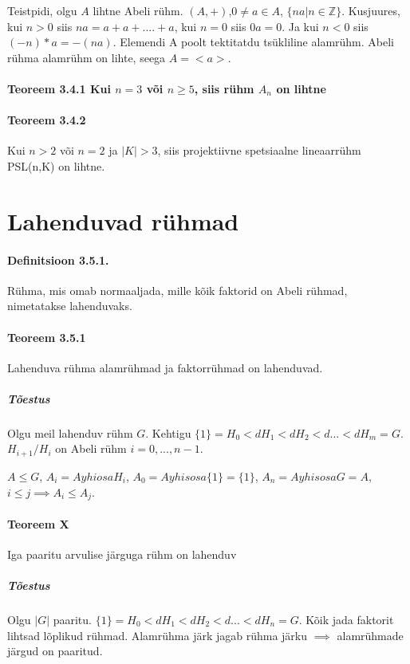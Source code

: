 \documentclass[12pt]{report}
\numberwithin{equation}{section}
\theoremstyle{definition}
\theoremstyle{plain}
\begin{document}
Teistpidi, olgu $A$ lihtne Abeli rühm. $(A,+)$,$0 \neq a \in A$, $ \{na | n \in \mathbb{Z}\}$. Kusjuures, kui $n >0 $ siis $na = a + a + .... + a$, kui $n=0$ siis $0a = 0$. Ja kui $n < 0$ siis $(-n)*a = -(na)$. Elemendi A poolt tektitatdu ts\"ukliline alamr\"uhm. Abeli rühma alamr\"uhm on lihte, seega $A = < a >$. 

\paragraph{Teoreem 3.4.1 Kui $n = 3$ või $n \geq 5$, siis rühm $A_n$ on lihtne }
   
\paragraph{Teoreem 3.4.2} Kui $n > 2$ või $n=2$ ja $|K| > 3$, siis projektiivne spetsiaalne lineaarr\"uhm PSL(n,K) on lihtne. 

\section{Lahenduvad rühmad}

\paragraph{Definitsioon 3.5.1.} R\"uhma, mis omab normaaljada, mille kõik faktorid on Abeli rühmad, nimetatakse lahenduvaks.

\paragraph{Teoreem 3.5.1} Lahenduva r\"uhma alamrühmad ja faktorrühmad on lahenduvad.

\subparagraph{Tõestus} Olgu meil lahenduv rühm $G$. Kehtigu $\{1\} = H_0 <d H_1 <d H_2 <d ... <d H_m = G$. $H_{i+1}/H_i $ on Abeli rühm $i=0,...,n-1$. 

$A \leq G $, $ A_i = A yhiosa H_i$, $A_0 = A yhisosa \{1\} = \{1\}$, $A_n = A yhisosa G = A$, $i \leq j \implies A_i \leq A_j$. 

\paragraph{Teoreem X} Iga paaritu arvulise järguga rühm on lahenduv

\subparagraph{Tõestus}
Olgu $|G|$ paaritu. $\{1\} = H_0 <d H_1 <d H_2 <d ... <d H_n = G$. Kõik jada faktorit lihtsad lõplikud rühmad. Alamrühma järk jagab rühma järku $\implies$ alamr\"uhmade järgud on paaritud. 
\end{document}
